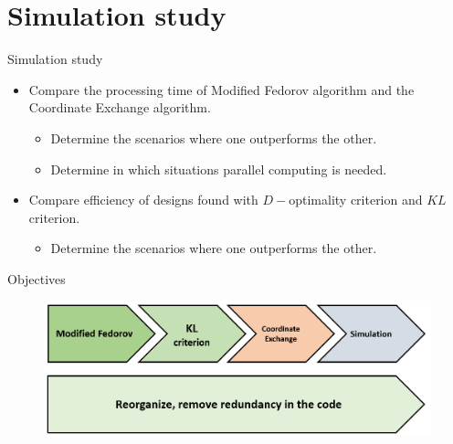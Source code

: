 \documentclass[11pt,t]{beamer}
\begin{document}
\section{Simulation study}
\begin{frame}[fragile]{Simulation study}
	\begin{itemize}
		\item Compare the processing time of Modified Fedorov algorithm and the Coordinate Exchange algorithm.
		\begin{itemize}
			\item Determine the scenarios where one outperforms the other.
			\item Determine in which situations parallel computing is needed.
		\end{itemize}
		\item Compare efficiency of designs found with $D-$optimality criterion and $KL$ criterion.
		\begin{itemize}
			\item Determine the scenarios where one outperforms the other.
		\end{itemize}
	\end{itemize}
\end{frame}

\begin{frame}[c]{Objectives}
	\begin{figure}
		\centering
		\includegraphics[scale = .6]{mygraphics/Objectives2.png}
	\end{figure}
\end{frame}
\end{document}
